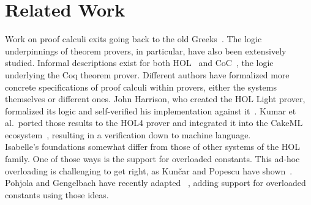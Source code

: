 \chapter{Related Work}\label{chapter:related}

Work on proof calculi exits going back to the old Greeks~\parencite{Lukasiewicz1951}.
The logic underpinnings of theorem provers, in particular, have also been extensively studied.
Informal descriptions exist for both HOL~\parencite{Gordon94} and CoC~\parencite{Huet88}, the logic underlying the Coq theorem prover.
Different authors have formalized more concrete specifications of proof calculi within provers, either the systems themselves or different ones.
John Harrison, who created the HOL Light prover, formalized its logic and self-verified his implementation against it~\parencite{Harrison06}.
Kumar et al.\ ported those results to the HOL4 prover and integrated it into the CakeML ecosystem~\parencite{Kumar2016}, resulting in a verification down to machine language.\\

Isabelle's foundations somewhat differ from those of other systems of the HOL family. One of those ways is the support for overloaded constants. This ad-hoc overloading is challenging to get right, as Kun{\v c}ar and Popescu have shown~\parencite{Kuncar19}. Pohjola and Gengelbach have recently adapted ~\parencite{Kumar2016}, adding support for overloaded constants using those ideas.